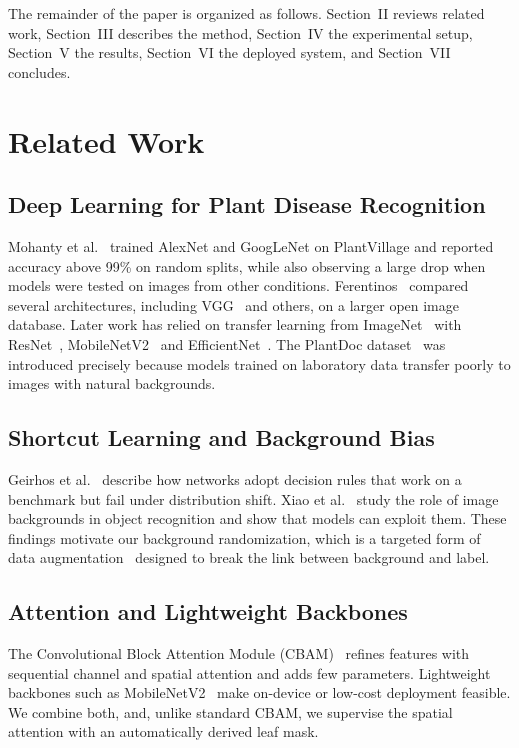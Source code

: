 \documentclass[conference]{IEEEtran}
\begin{document}
The remainder of the paper is organized as follows. Section~II reviews related work, Section~III describes the method, Section~IV the experimental setup, Section~V the results, Section~VI the deployed system, and Section~VII concludes.

\section{Related Work}
\subsection{Deep Learning for Plant Disease Recognition}
Mohanty et al.~\cite{mohanty2016} trained AlexNet and GoogLeNet on PlantVillage and reported accuracy above 99\% on random splits, while also observing a large drop when models were tested on images from other conditions. Ferentinos~\cite{ferentinos2018} compared several architectures, including VGG~\cite{simonyan2015} and others, on a larger open image database. Later work has relied on transfer learning from ImageNet~\cite{deng2009} with ResNet~\cite{he2016}, MobileNetV2~\cite{sandler2018} and EfficientNet~\cite{tan2019}. The PlantDoc dataset~\cite{singh2020} was introduced precisely because models trained on laboratory data transfer poorly to images with natural backgrounds.

\subsection{Shortcut Learning and Background Bias}
Geirhos et al.~\cite{geirhos2020} describe how networks adopt decision rules that work on a benchmark but fail under distribution shift. Xiao et al.~\cite{xiao2021} study the role of image backgrounds in object recognition and show that models can exploit them. These findings motivate our background randomization, which is a targeted form of data augmentation~\cite{shorten2019} designed to break the link between background and label.

\subsection{Attention and Lightweight Backbones}
The Convolutional Block Attention Module (CBAM)~\cite{woo2018} refines features with sequential channel and spatial attention and adds few parameters. Lightweight backbones such as MobileNetV2~\cite{sandler2018} make on-device or low-cost deployment feasible. We combine both, and, unlike standard CBAM, we supervise the spatial attention with an automatically derived leaf mask.
\end{document}
